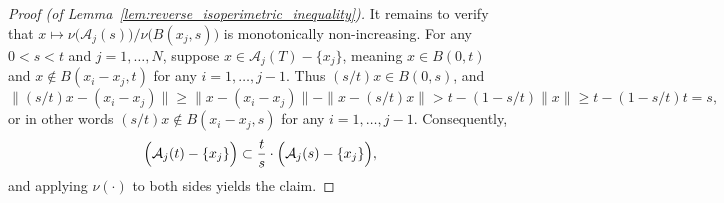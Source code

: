 \documentclass{article}
\newcommand{\1}{\mathbf{1}}
\newcommand{\mc}[1]{\mathcal{#1}}
\theoremstyle{definition}
\theoremstyle{remark}
\begin{document}
\begin{proof}[Proof (of Lemma~\ref{lem:reverse_isoperimetric_inequality})]
	It remains to verify that $x \mapsto \nu\bigl(\mc{A}_j(s)\bigr)/\nu\bigl(B(x_j,s)\bigr)$ is monotonically non-increasing. For any $0 < s < t$ and $j = 1,\ldots,N$, suppose $x \in \mc{A}_j(T) - \{x_j\}$, meaning $x \in B(0,t)$ and $x \not\in B(x_i - x_j,t)$ for any $i = 1,\ldots,j - 1$. Thus $(s/t)x \in B(0,s)$, and
	\begin{equation*}
	\|(s/t)x - (x_i - x_j)\| \geq \|x - (x_i - x_j)\| - \|x - (s/t)x\| > t - (1 - s/t)\|x\| \geq t - (1 - s/t)t = s,
	\end{equation*}
	or in other words $(s/t)x \not\in B(x_i - x_j,s)$ for any $i = 1,\ldots,j - 1$. Consequently,
	\begin{equation*}
	\Bigl(\mc{A}_j(t) - \{x_j\}\Bigr) \subset \frac{t}{s} \cdot \Bigl(\mc{A}_{j}(s)- \{x_j\}\Bigr),
	\end{equation*}
	and applying $\nu(\cdot)$ to both sides yields the claim.
\end{proof}
	
\end{document}
